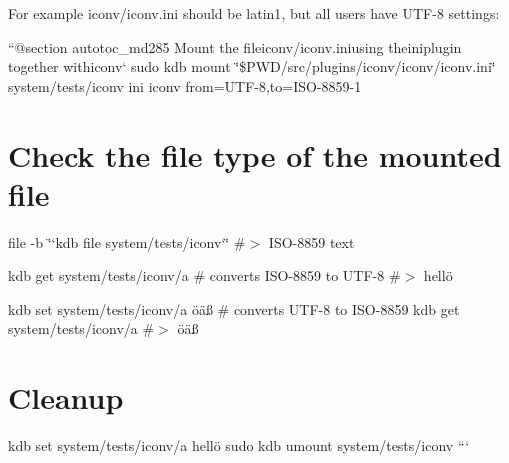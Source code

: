 For example {\ttfamily iconv/iconv.\+ini} should be {\ttfamily latin1}, but all users have {\ttfamily U\+T\+F-\/8} settings\+:

``{\ttfamily  @section autotoc\+\_\+md285 Mount the file}iconv/iconv.\+ini{\ttfamily using the}ini{\ttfamily plugin together with}iconv` sudo kdb mount \char`\"{}\$\+P\+W\+D/src/plugins/iconv/iconv/iconv.\+ini\char`\"{} system/tests/iconv ini iconv from=U\+T\+F-\/8,to=I\+S\+O-\/8859-\/1\hypertarget{autotoc_md282_autotoc_md286}{}\section{Check the file type of the mounted file}\label{autotoc_md282_autotoc_md286}
file -\/b \char`\"{}`kdb file system/tests/iconv`\char`\"{} \#$>$ I\+S\+O-\/8859 text

kdb get system/tests/iconv/a \# converts I\+S\+O-\/8859 to U\+T\+F-\/8 \#$>$ hellö

kdb set system/tests/iconv/a öäß \# converts U\+T\+F-\/8 to I\+S\+O-\/8859 kdb get system/tests/iconv/a \#$>$ öäß\hypertarget{autotoc_md282_autotoc_md287}{}\section{Cleanup}\label{autotoc_md282_autotoc_md287}
kdb set system/tests/iconv/a hellö sudo kdb umount system/tests/iconv ``` 